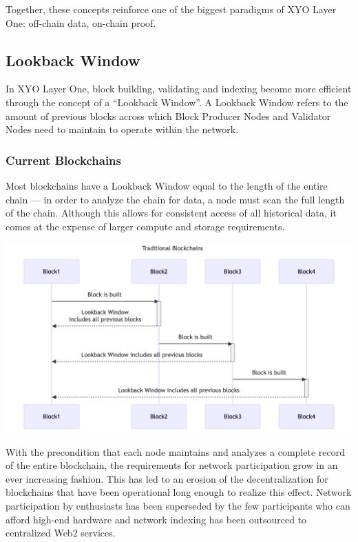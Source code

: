 \documentclass{article}
\begin{document}
Together, these concepts reinforce one of the biggest paradigms of XYO Layer One: off-chain data, on-chain proof.

\subsection{Lookback Window}
In XYO Layer One, block building, validating and indexing become more efficient through the concept of a “Lookback Window”. A Lookback Window refers to the amount of previous blocks across which Block Producer Nodes and Validator Nodes need to maintain to operate within the network. 

\subsubsection{Current Blockchains}
Most blockchains have a Lookback Window equal to the length of the entire chain — in order to analyze the chain for data, a node must scan the full length of the chain. Although this allows for consistent access of all historical data, it comes at the expense of larger compute and storage requirements.

\begin{center}
    \includegraphics[width=15cm]{trad-blockchain-lookback-window.png}
\end{center}

With the precondition that each node maintains and analyzes a complete record of the entire blockchain, the requirements for network participation grow in an ever increasing fashion. This has led to an erosion of the decentralization for blockchains that have been operational long enough to realize this effect. Network participation by enthusiasts has been superseded by the few participants who can afford high-end hardware and network indexing has been outsourced to centralized Web2 services.
\end{document}

